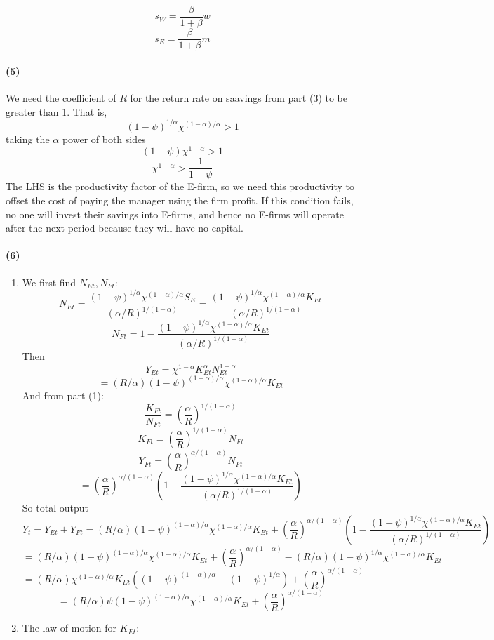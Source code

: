 \documentclass[10pt,letter]{article}
\newcommand{\problempart}[1]{\paragraph{#1}}
\begin{document}
\[ s_W = \frac{\beta}{1+\beta} w \]
\[ s_E = \frac{\beta}{1+\beta} m \]
\problempart{(5)}
We need the coefficient of $R$ for the return rate on saavings from part (3) to be greater than 1. That is,
\[(1-\psi)^{1/\alpha}\chi^{(1-\alpha)/\alpha} > 1\]
taking the $\alpha$ power of both sides
\[ (1-\psi) \chi^{1-\alpha} > 1\]
\[ \chi^{1-\alpha} > \frac{1}{1-\psi} \]
The LHS is the productivity factor of the E-firm, so we need this productivity to offset the cost of paying the manager using the firm profit. If this condition fails, no one will invest their savings into E-firms, and hence no E-firms will operate after the next period because they will have no capital.
\problempart{(6)}

\begin{enumerate}[label=(\roman*)]
\item We first find $N_{Et}, N_{Ft}$:
\[ N_{Et} = \frac{(1-\psi)^{1/\alpha}\chi^{(1-\alpha)/\alpha}S_E}{\left(\alpha/R \right)^{1/(1-\alpha)}} = \frac{(1-\psi)^{1/\alpha}\chi^{(1-\alpha)/\alpha}K_{Et}}{\left(\alpha/R \right)^{1/(1-\alpha)}} \]
\[ N_{Ft} = 1 - \frac{(1-\psi)^{1/\alpha}\chi^{(1-\alpha)/\alpha}K_{Et}}{\left(\alpha/R \right)^{1/(1-\alpha)}} \]
Then
\[ Y_{Et} = \chi^{1-\alpha} K_{Et}^\alpha N_{Et}^{1-\alpha} \]
\[ =  (R/\alpha)(1-\psi)^{(1-\alpha)/\alpha}\chi^{(1-\alpha)/\alpha}K_{Et}\]
And from part (1):
\[ \frac{K_{Ft}}{N_{Ft}} = \left(\frac{\alpha}{R}\right)^{1/(1-\alpha )} \]
\[ K_{Ft} = \left(\frac{\alpha}{R}\right)^{1/(1-\alpha )} N_{Ft} \]
\[ Y_{Ft} = \left(\frac{\alpha}{R}\right)^{\alpha/(1-\alpha)} N_{Ft} \]
\[ = \left(\frac{\alpha}{R}\right)^{\alpha/(1-\alpha)} \left(1 - \frac{(1-\psi)^{1/\alpha}\chi^{(1-\alpha)/\alpha}K_{Et}}{\left(\alpha/R \right)^{1/(1-\alpha)}} \right) \]
So total output
\[ Y_t = Y_{Et} + Y_{Ft} = (R/\alpha)(1-\psi)^{(1-\alpha)/\alpha}\chi^{(1-\alpha)/\alpha}K_{Et} + \left(\frac{\alpha}{R}\right)^{\alpha/(1-\alpha)} \left(1 - \frac{(1-\psi)^{1/\alpha}\chi^{(1-\alpha)/\alpha}K_{Et}}{\left(\alpha/R \right)^{1/(1-\alpha)}} \right) \]
\[ = (R/\alpha)(1-\psi)^{(1-\alpha)/\alpha}\chi^{(1-\alpha)/\alpha}K_{Et} + \left(\frac{\alpha}{R}\right)^{\alpha/(1-\alpha)}  - (R/\alpha)(1-\psi)^{1/\alpha}\chi^{(1-\alpha)/\alpha}K_{Et}  \]
\[ = (R/\alpha)\chi^{(1-\alpha)/\alpha}K_{Et} \left((1-\psi)^{(1-\alpha)/\alpha} - (1-\psi)^{1/\alpha} \right) + \left(\frac{\alpha}{R}\right)^{\alpha/(1-\alpha)}   \]
\[ = (R/\alpha)\psi(1-\psi)^{(1-\alpha)/\alpha}\chi^{(1-\alpha)/\alpha}K_{Et}  + \left(\frac{\alpha}{R}\right)^{\alpha/(1-\alpha)}   \]
\item The law of motion for $K_{Et}$:

\end{enumerate}
\end{document}
